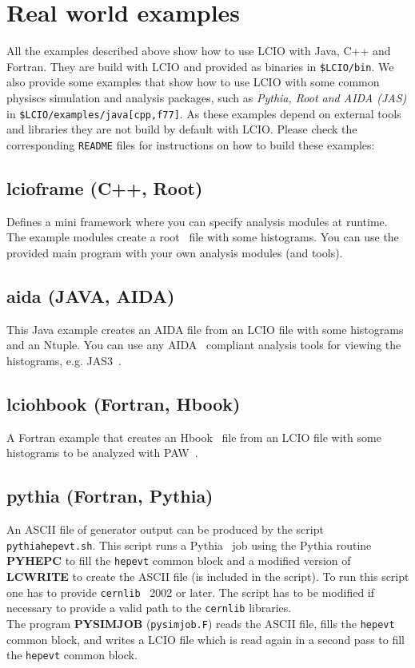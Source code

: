 \documentclass[twoside]{article}
\begin{document}


\section{Real world examples} \label{realworld}
All the examples described above show how to use LCIO with Java, C++ and Fortran. They are build 
with LCIO and provided as binaries in \verb#$LCIO/bin#.
We also provide some examples that show how to use LCIO with some common physiscs simulation
and analysis packages, such as {\em  Pythia, Root and AIDA (JAS)} in 
\verb#$LCIO/examples/java[cpp,f77]#.
As these examples depend on external tools and libraries they are not build by default with LCIO.
Please check the corresponding \verb$README$ files for instructions on how to build these examples:


\subsection{lcioframe (C++, Root)} \label{rwlcioframe}

Defines a mini framework where you can specify analysis modules at 
runtime.
The example modules create a root~\cite{ref_root} file with some histograms. 
You can use the provided main program with your own analysis modules (and tools). 

\subsection{aida (JAVA, AIDA)} \label{rwaida}

This Java example creates an AIDA file from an LCIO file with some histograms
and an Ntuple. You can use any AIDA~\cite{ref_aida} compliant analysis tools for 
viewing the histograms, e.g. JAS3~\cite{ref_jas}.

\subsection{lciohbook (Fortran, Hbook)} \label{rwhbook}

A Fortran example that creates an Hbook~\cite{ref_cernlib} file from an LCIO file with 
some histograms to be analyzed with PAW~\cite{ref_cernlib}.

\subsection{pythia (Fortran, Pythia)} \label{rwpythia}

An ASCII file of generator output can be produced by the script \verb$pythiahepevt.sh$.
This script runs a Pythia~\cite{ref_pythia} job
using the Pythia routine {\bf PYHEPC} to fill the \verb$hepevt$ common block 
and a modified version of {\bf LCWRITE} to create the ASCII file (is included in the script). To run this script
one has to provide \verb$cernlib$~\cite{ref_cernlib} 2002 or later. The script has to be modified if necessary
to provide a valid path to the \verb$cernlib$ libraries. \\
The program {\bf PYSIMJOB} (\verb$pysimjob.F$) reads the ASCII file, fills the \verb$hepevt$ common 
block, and writes a LCIO file which is read again in a second pass to fill the \verb$hepevt$ common 
block.
\end{document}
